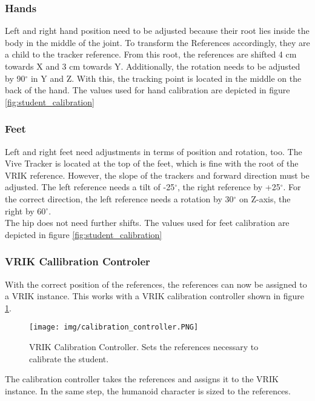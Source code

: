 \subsubsection{Hands}
Left and right hand position need to be adjusted because their root lies inside the body in the middle of the joint. To transform the References accordingly, they are a child to the tracker reference. From this root, the references are shifted 4 cm towards X and 3 cm towards Y. Additionally, the rotation needs to be adjusted by 90$^\circ$ in Y and Z. With this, the tracking point is located in the middle on the back of the hand. The values used for hand calibration are depicted in figure \ref{fig:student_calibration}
\subsubsection{Feet}
Left and right feet need adjustments in terms of position and rotation, too. The Vive Tracker is located at the top of the feet, which is fine with the root of the VRIK reference. However, the slope of the trackers and forward direction must be adjusted. The left reference needs a tilt of -25$^\circ$, the right reference by +25$^\circ$. For the correct direction, the left reference needs a rotation by 30$^\circ$ on Z-axis, the right by 60$^\circ$.\\
The hip does not need further shifts. The values used for feet calibration are depicted in figure \ref{fig:student_calibration}

\subsubsection{VRIK Callibration Controler}
With the correct position of the references, the references can now be assigned to a VRIK instance. This works with a VRIK calibration controller shown in figure \ref{fig:calibrationController}.
\begin{figure}
	\centering
	\texttt{[image: img/calibration\_controller.PNG]}
	\caption{VRIK Calibration Controller. Sets the references necessary to calibrate the student.}
	\label{fig:calibrationController}
\end{figure}
The calibration controller takes the references and assigns it to the VRIK instance. In the same step, the humanoid character is sized to the references.

